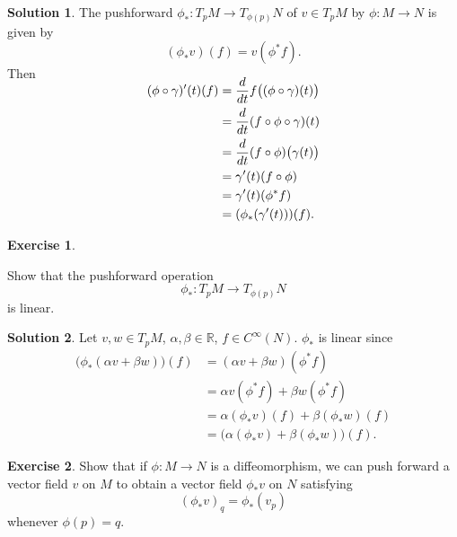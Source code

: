 \documentclass[11pt, a4paper]{report}
\theoremstyle{definition}
\newtheorem{exercise}{Exercise}[part]
\newtheorem{solution}{Solution}[part]
\newenvironment{ex}{\begin{exercise}}{\end{exercise}\pagebreak[1]}
\newenvironment{sol}{\begin{solution}}{\end{solution}\pagebreak[3]}
\newenvironment{nowidthtags}{\usetagform{nowidth}}{\ignorespacesafterend}
\begin{document}
\begin{sol}

The pushforward $\phi_*: T_p M \to T_{\phi(p)} N$ of $v \in T_p M$ by $\phi: M \to N$ is given by
\begin{nowidthtags}
\[
    (\phi_* v) (f) = v (\phi^* f). \tag{pushforward of a vector}\label{eq:pushforwardvector}
\]
\end{nowidthtags}
Then
\begin{align*}
    \SwapAboveDisplaySkip
    (\phi \circ \gamma)'(t)(f) &= \frac{d}{dt} f \bigl( (\phi \circ \gamma)(t) \bigr) \\
        &= \frac{d}{dt} (f \circ \phi \circ \gamma)(t) \\
        &= \frac{d}{dt} (f \circ \phi) \bigl( \gamma(t) \bigr) \\
        &= \gamma'(t)(f \circ \phi) \\
        &= \gamma'(t)(\phi^* f) \\
        &= (\phi_* (\gamma'(t)))(f).
\end{align*}

\end{sol}

\begin{ex}\label{ex:pushforwardislinear}

Show that the pushforward operation
\[
    \phi_*: T_p M \to T_{\phi(p)} N
\]
is linear.

\end{ex}

\begin{sol}

Let $v, w \in T_p M$, $\alpha, \beta \in \mathbb{R}$, $f \in C^\infty(N)$. $\phi_*$ is linear since
\begin{align*}
    \bigl( \phi_*(\alpha v + \beta w) \bigr)(f) &= (\alpha v + \beta w) (\phi^* f) \\
        &= \alpha v (\phi^* f) + \beta w (\phi^* f) \\
        &= \alpha (\phi_* v)(f) + \beta (\phi_* w)(f) \\
        &= \bigl( \alpha (\phi_* v) + \beta (\phi_* w) \bigr)(f).
\end{align*}

\end{sol}

\begin{ex}

Show that if $\phi: M \to N$ is a diffeomorphism, we can push forward a vector field $v$ on $M$ to obtain a vector field $\phi_*v$ on $N$ satisfying
\[
    {(\phi_* v)}_q = \phi_*(v_p)
\]
whenever $\phi(p) = q$.

\end{ex}
\end{document}

